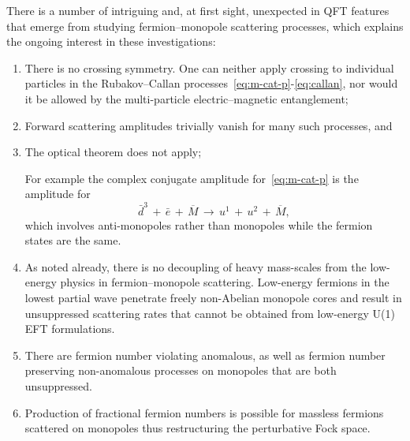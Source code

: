 \documentclass[a4paper,11pt]{article}
\begin{document}
  
\medskip  
There is a number of intriguing and, at first sight, unexpected in QFT features that emerge from studying fermion--monopole scattering processes, which explains
the ongoing interest in these investigations:
\begin{enumerate}
\item{} There is no crossing symmetry. One can neither apply crossing  to individual particles in the Rubakov--Callan 
processes~\eqref{eq:m-cat-p}-\eqref{eq:callan}, nor would it be allowed by the multi-particle electric--magnetic entanglement;
\item{} Forward scattering amplitudes trivially vanish for many such processes, and
\item{} The optical theorem does not apply;

For example the complex conjugate amplitude for~\eqref{eq:m-cat-p} is the amplitude for
\begin{equation}
\label{eq:m-cat-p2}
\bar{d}^{3} \,+\, \bar{e} \,+\,  \overline{M} \,\to\, 
 u^1 \,+\,u^2 \,+\,  \overline{M},
\end{equation}  
which involves anti-monopoles rather than monopoles while the fermion states are the same.

\item{} As noted already, there is no decoupling of heavy mass-scales from the low-energy physics in fermion--monopole scattering. Low-energy fermions in the lowest partial wave penetrate freely non-Abelian monopole cores and result in unsuppressed scattering rates that cannot be obtained from low-energy U(1) EFT formulations.

\item{} There are fermion number violating anomalous, as well as fermion number preserving non-anomalous processes on monopoles that are both unsuppressed.

\item{} Production of fractional fermion numbers is possible for massless fermions scattered on monopoles thus restructuring the perturbative Fock space.

\end{enumerate}



\medskip
\end{document}
